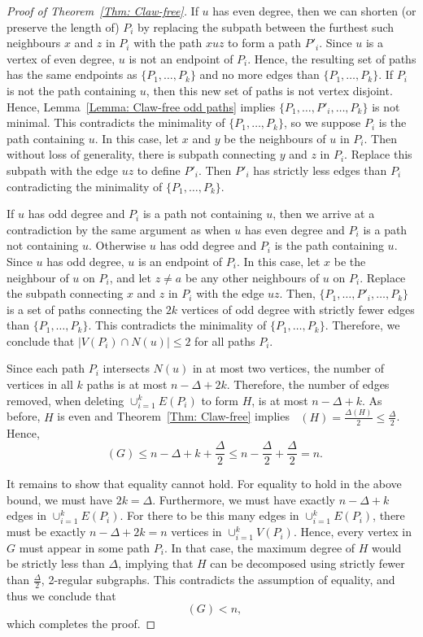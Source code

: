 \documentclass[11pt]{amsart}
\theoremstyle{definition}
\DeclareMathOperator{\re}{f_{re}}
\begin{document}
\begin{proof}[Proof of Theorem~\ref{Thm: Claw-free}]
If $u$ has even degree, then we can shorten (or preserve the length of) $P_i$ by replacing the subpath between the furthest such neighbours $x$ and $z$ in $P_i$ with the path $xuz$ to form a path $P'_i$. 
Since $u$ is a vertex of even degree, $u$ is not an endpoint of $P_i$.
Hence, the resulting set of paths has the same endpoints as $\{P_1,\dots, P_k\}$ and no more edges than $\{P_1,\dots, P_k\}$.
If $P_i$ is not the path containing $u$, then this new set of paths is not vertex disjoint.
Hence,
Lemma~\ref{Lemma: Claw-free odd paths} implies $\{P_1,\dots, P'_i,\dots, P_k\}$ is not minimal.
This contradicts the minimality of $\{P_1,\dots, P_k\}$, so we suppose $P_i$ is the path containing $u$.
In this case, 
let $x$ and $y$ be the neighbours of $u$ in $P_i$.
Then without loss of generality, there is subpath connecting $y$ and $z$ in $P_i$.
Replace this subpath with the edge $uz$
to define $P'_i$.
Then $P'_i$ has strictly less edges than $P_i$ contradicting the minimality of $\{P_1,\dots, P_k\}$.

If $u$ has odd degree and $P_i$ is a path not containing $u$, 
then we arrive at a contradiction by the same argument as when $u$ has even degree and $P_i$ is a path not containing $u$.
Otherwise $u$ has odd degree and $P_i$ is the path containing $u$.
Since $u$ has odd degree, $u$ is an endpoint of $P_i$.
In this case, let $x$ be the neighbour of $u$ on $P_i$, and let $z \neq a$ be any other neighbours of $u$ on $P_i$.
Replace the subpath connecting $x$ and $z$ in $P_i$ with the edge $uz$.
Then, $\{P_1,\dots, P'_i,\dots, P_k\}$ is a set of paths connecting the $2k$ vertices of odd degree with strictly fewer edges than $\{P_1,\dots,P_k\}$.
This contradicts the minimality of $\{P_1,\dots, P_k\}$.
Therefore, we conclude that $|V(P_i) \cap N(u)| \leq 2$ for all paths $P_i$.


Since each path  $P_i$ intersects $N(u)$ in at most two vertices, the number of vertices in all $k$ paths is at most $n - \Delta + 2k$. 
Therefore, the number of edges removed, when deleting $\cup_{i=1}^k E(P_i)$ to form $H$, is at most
$
n - \Delta + k.
$
As before, $H$ is even and Theorem~\ref{Thm: Claw-free} implies  $ \re(H) = \frac{\Delta(H)}{2} \leq \frac{\Delta}{2}$. Hence,
\[
\re(G) \leq n - \Delta + k + \frac{\Delta}{2} \leq n - \frac{\Delta}{2} + \frac{\Delta}{2} = n.
\]

It remains to show that equality cannot hold. 
For equality to hold in the above bound, we must have \( 2k = \Delta \).
Furthermore, we must have exactly $n-\Delta+k$ edges in $\cup_{i=1}^k E(P_i)$.
For there to be this many edges in $\cup_{i=1}^k E(P_i)$, there must be exactly $n - \Delta + 2k = n$ vertices in 
$\cup_{i=1}^k V(P_i)$.
Hence, every vertex in \( G \) must appear in some path \( P_i \).
In that case, the maximum degree of $H$ would be strictly less than $\Delta$, implying that $H$ can be decomposed using strictly fewer than $ \frac{\Delta}{2}$, 2-regular subgraphs. This contradicts the assumption of equality, and thus we conclude that
\[
\re(G) < n,
\]
which completes the proof.
\end{proof}
\end{document}
